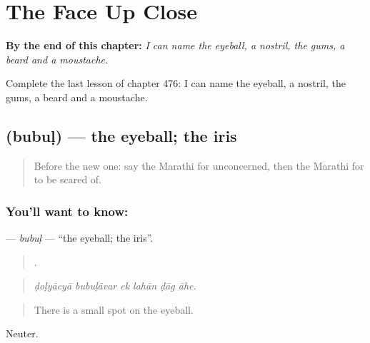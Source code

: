 
\chapter{The Face Up Close}
\label{ch:mr-the-face-up-close}

\begin{chapteropening}
\textbf{By the end of this chapter:} \emph{I can name the eyeball, a nostril, the gums, a beard and a moustache.}

Complete the last lesson of chapter 476: I can name the eyeball, a nostril, the gums, a beard and a moustache.
\end{chapteropening}

\section[\texorpdfstring{\mr{बुबुळ} (bubuḷ)}{बुबुळ (bubuḷ)}]{ (bubuḷ) — the eyeball; the iris}

\label{lesson:MR-C476-bubul}



\begin{quote}
Before the new one: say the Marathi for unconcerned, then the Marathi for to be scared of.
\end{quote}

\subsection*{You'll want to know: }
\textbf{} — \emph{bubuḷ} — \textquotedblleft{}the eyeball; the iris\textquotedblright{}.

\begin{quote}
     .
\end{quote}

\begin{quote}
\emph{ḍoḷyācyā bubuḷāvar ek lahān ḍāg āhe.}
\end{quote}

\begin{quote}
There is a small spot on the eyeball.
\end{quote}

Neuter.

